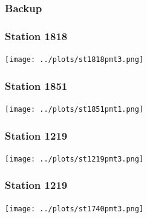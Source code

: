 \documentclass[aspectratio=169]{beamer}
\begin{document}

\begin{frame}
  \frametitle{Backup}
\end{frame}

\begin{frame}
  \frametitle{Station 1818}
  \centering
  \texttt{[image: ../plots/st1818pmt3.png]}
\end{frame}

\begin{frame}
  \frametitle{Station 1851}
  \centering
  \texttt{[image: ../plots/st1851pmt1.png]}
\end{frame}

\begin{frame}
  \frametitle{Station 1219}
  \centering
  \texttt{[image: ../plots/st1219pmt3.png]}
\end{frame}

\begin{frame}
  \frametitle{Station 1219}
  \centering
  \texttt{[image: ../plots/st1740pmt3.png]}
\end{frame}





\end{document}
